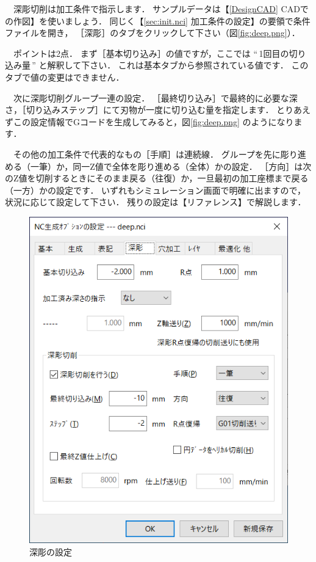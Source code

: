 \begin{minipage}[t]{0.5\textwidth}
　深彫切削は加工条件で指示します．
サンプルデータは【\ref{DesignCAD} CADでの作図】を使いましょう．
同じく【\ref{sec:init.nci} 加工条件の設定】の要領で条件ファイルを開き，
［深彫］のタブをクリックして下さい（図\ref{fig:deep.png}）．

　ポイントは2点．
まず［基本切り込み］の値ですが，ここでは ``\,1回目の切り込み量\,'' と解釈して下さい．
これは基本タブから参照されている値です．
このタブで値の変更はできません．

　次に深彫切削グループ一連の設定．
［最終切り込み］で最終的に必要な深さ，［切り込みステップ］にて刃物が一度に切り込む量を指定します．
とりあえずこの設定情報でGコードを生成してみると，図\ref{fig:deep.png} のようになります．

　その他の加工条件で代表的なもの［手順］は連続線．
グループを先に彫り進める（一筆）か，同一Z値で全体を彫り進める（全体）かの設定．
［方向］は次のZ値を切削するときにそのまま戻る（往復）か，一旦最初の加工座標まで戻る（一方）かの設定です．
いずれもシミュレーション画面で明確に出ますので，状況に応じて設定して下さい．
残りの設定は【リファレンス】で解説します．
\end{minipage}
\begin{minipage}[t]{0.5\textwidth}
\vspace*{-2zh}
\begin{figure}[H]
\centering
\includegraphics[scale=0.7]{No3/fig/deep-setup.png}
\caption{深彫の設定}
\label{fig:deep-setup.png}
\end{figure}
\end{minipage}

